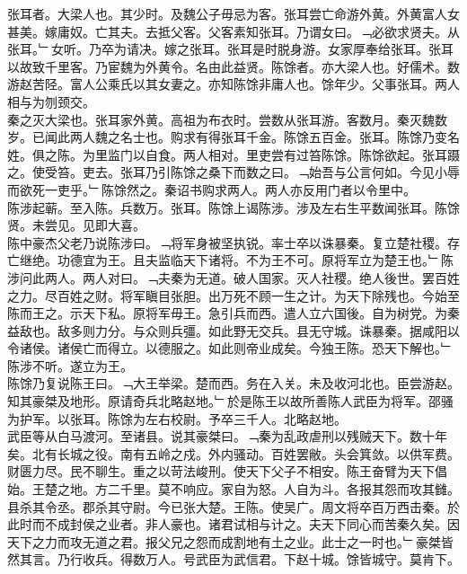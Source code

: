 \documentclass{zhvt-classic}
\begin{document}

\hspace*{2em}张耳者。大梁人也。其少时。及魏公子毋忌为客。张耳尝亡命游外黄。外黄富人女甚美。嫁庸奴。亡其夫。去抵父客。父客素知张耳。乃谓女曰。﹁必欲求贤夫。从张耳。﹂女听。乃卒为请决。嫁之张耳。张耳是时脱身游。女家厚奉给张耳。张耳以故致千里客。乃宦魏为外黄令。名由此益贤。陈馀者。亦大梁人也。好儒术。数游赵苦陉。富人公乘氏以其女妻之。亦知陈馀非庸人也。馀年少。父事张耳。两人相与为刎颈交。\\
\hspace*{2em}秦之灭大梁也。张耳家外黄。高祖为布衣时。尝数从张耳游。客数月。秦灭魏数岁。已闻此两人魏之名士也。购求有得张耳千金。陈馀五百金。张耳。陈馀乃变名姓。俱之陈。为里监门以自食。两人相对。里吏尝有过笞陈馀。陈馀欲起。张耳蹑之。使受笞。吏去。张耳乃引陈馀之桑下而数之曰。﹁始吾与公言何如。今见小辱而欲死一吏乎。﹂陈馀然之。秦诏书购求两人。两人亦反用门者以令里中。\\
\hspace*{2em}陈涉起蕲。至入陈。兵数万。张耳。陈馀上谒陈涉。涉及左右生平数闻张耳。陈馀贤。未尝见。见即大喜。\\
\hspace*{2em}陈中豪杰父老乃说陈涉曰。﹁将军身被坚执锐。率士卒以诛暴秦。复立楚社稷。存亡继绝。功德宜为王。且夫监临天下诸将。不为王不可。原将军立为楚王也。﹂陈涉问此两人。两人对曰。﹁夫秦为无道。破人国家。灭人社稷。绝人後世。罢百姓之力。尽百姓之财。将军瞋目张胆。出万死不顾一生之计。为天下除残也。今始至陈而王之。示天下私。原将军毋王。急引兵而西。遣人立六国後。自为树党。为秦益敌也。敌多则力分。与众则兵彊。如此野无交兵。县无守城。诛暴秦。据咸阳以令诸侯。诸侯亡而得立。以德服之。如此则帝业成矣。今独王陈。恐天下解也。﹂陈涉不听。遂立为王。\\
\hspace*{2em}陈馀乃复说陈王曰。﹁大王举梁。楚而西。务在入关。未及收河北也。臣尝游赵。知其豪桀及地形。原请奇兵北略赵地。﹂於是陈王以故所善陈人武臣为将军。邵骚为护军。以张耳。陈馀为左右校尉。予卒三千人。北略赵地。\\
\hspace*{2em}武臣等从白马渡河。至诸县。说其豪桀曰。﹁秦为乱政虐刑以残贼天下。数十年矣。北有长城之役。南有五岭之戍。外内骚动。百姓罢敝。头会箕敛。以供军费。财匮力尽。民不聊生。重之以苛法峻刑。使天下父子不相安。陈王奋臂为天下倡始。王楚之地。方二千里。莫不响应。家自为怒。人自为斗。各报其怨而攻其雠。县杀其令丞。郡杀其守尉。今已张大楚。王陈。使吴广。周文将卒百万西击秦。於此时而不成封侯之业者。非人豪也。诸君试相与计之。夫天下同心而苦秦久矣。因天下之力而攻无道之君。报父兄之怨而成割地有土之业。此士之一时也。﹂豪桀皆然其言。乃行收兵。得数万人。号武臣为武信君。下赵十城。馀皆城守。莫肯下。\\
\end{document}

